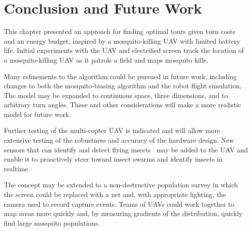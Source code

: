 \section{Conclusion and Future Work}\label{sec:conclusion}

This chapter presented an approach for finding optimal tours given turn costs and an energy budget, inspired by a mosquito-killing UAV with limited battery life. 
Initial experiments with the UAV and electrified screen track the location of a mosquito-killing UAV as it patrols a field and maps mosquito kills.  

Many refinements to the algorithm could be pursued in future work, including changes to both the mosquito-biasing algorithm and the robot flight simulation.  The model may be expanded to continuous space, three dimensions, and to arbitrary turn angles.  These and other considerations will make a more realistic model for future work.  

Further testing of the multi-copter UAV is indicated and will allow more extensive testing of the robustness and accuracy of the hardware design. New sensors that can identify and detect flying insects~\cite{chen2014flying} may be added to the UAV and enable it to proactively steer toward insect swarms and identify insects in realtime.

The concept may be extended to a non-destructive population survey in which the screen could be replaced with a net and, with appropriate lighting, the camera used to record capture events.  Teams of UAVs could work together to map areas more quickly and, by measuring gradients of the distribution, quickly find large mosquito populations.

